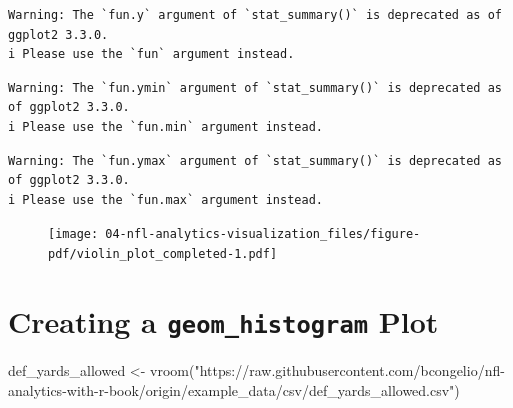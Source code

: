 \documentclass[
  letterpaper,
]{krantz}
\newenvironment{Shaded}{\begin{snugshade}}{\end{snugshade}}
\newcommand{\FunctionTok}[1]{\textcolor[rgb]{0.28,0.35,0.67}{#1}}
\newcommand{\NormalTok}[1]{\textcolor[rgb]{0.00,0.23,0.31}{#1}}
\newcommand{\OtherTok}[1]{\textcolor[rgb]{0.00,0.23,0.31}{#1}}
\newcommand{\StringTok}[1]{\textcolor[rgb]{0.13,0.47,0.30}{#1}}
\begin{document}
\begin{verbatim}
Warning: The `fun.y` argument of `stat_summary()` is deprecated as of ggplot2 3.3.0.
i Please use the `fun` argument instead.
\end{verbatim}

\begin{verbatim}
Warning: The `fun.ymin` argument of `stat_summary()` is deprecated as of ggplot2 3.3.0.
i Please use the `fun.min` argument instead.
\end{verbatim}

\begin{verbatim}
Warning: The `fun.ymax` argument of `stat_summary()` is deprecated as of ggplot2 3.3.0.
i Please use the `fun.max` argument instead.
\end{verbatim}

\begin{figure}[H]

{\centering \texttt{[image: 04-nfl-analytics-visualization\_files/figure-pdf/violin\_plot\_completed-1.pdf]}

}

\end{figure}

\hypertarget{creating-a-geom_histogram-plot}{%
\section{\texorpdfstring{Creating a \texttt{geom\_histogram}
Plot}{Creating a geom\_histogram Plot}}\label{creating-a-geom_histogram-plot}}

\begin{Shaded}
\begin{Highlighting}[]
\NormalTok{def\_yards\_allowed }\OtherTok{\textless{}{-}}
  \FunctionTok{vroom}\NormalTok{(}\StringTok{"https://raw.githubusercontent.com/bcongelio/nfl{-}analytics{-}with{-}r{-}book/origin/example\_data/csv/def\_yards\_allowed.csv"}\NormalTok{)}
\end{Highlighting}
\end{Shaded}
\end{document}
